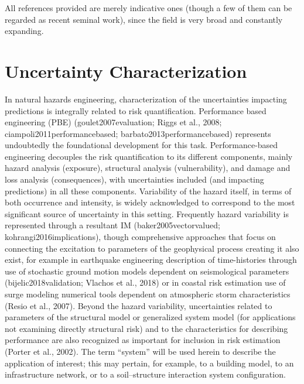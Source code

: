 All references provided are merely indicative ones (though a few of them can be regarded as recent seminal work), since the field is very broad and constantly expanding.

\section{Uncertainty Characterization}
\label{sec:uq_characterization}

In natural hazards engineering, characterization of the uncertainties impacting predictions is integrally related to risk quantification. Performance based engineering (PBE) (goulet2007evaluation; Riggs et al., 2008; ciampoli2011performancebased; barbato2013performancebased) represents undoubtedly the foundational development for this task. Performance-based engineering decouples the risk quantification to its different components, mainly hazard analysis (exposure), structural analysis (vulnerability), and damage and loss analysis (consequences), with uncertainties included (and impacting predictions) in all these components. Variability of the hazard itself, in terms of both occurrence and intensity, is widely acknowledged to correspond to the most significant source of uncertainty in this setting. Frequently hazard variability is represented through a resultant IM (baker2005vectorvalued; kohrangi2016implications), though comprehensive approaches that focus on connecting the excitation to parameters of the geophysical process creating it also exist, for example in earthquake engineering description of time-histories through use of stochastic ground motion models dependent on seismological parameters (bijelic2018validation; Vlachos et al., 2018) or in coastal risk estimation use of surge modeling numerical tools dependent on atmospheric storm characteristics (Resio et al., 2007). Beyond the hazard variability, uncertainties related to parameters of the structural model or generalized system model (for applications not examining directly structural risk) and to the characteristics for describing performance are also recognized as important for inclusion in risk estimation (Porter et al., 2002). The term “system” will be used herein to describe the application of interest; this may pertain, for example, to a building model, to an infrastructure network, or to a soil–structure interaction system configuration. 

